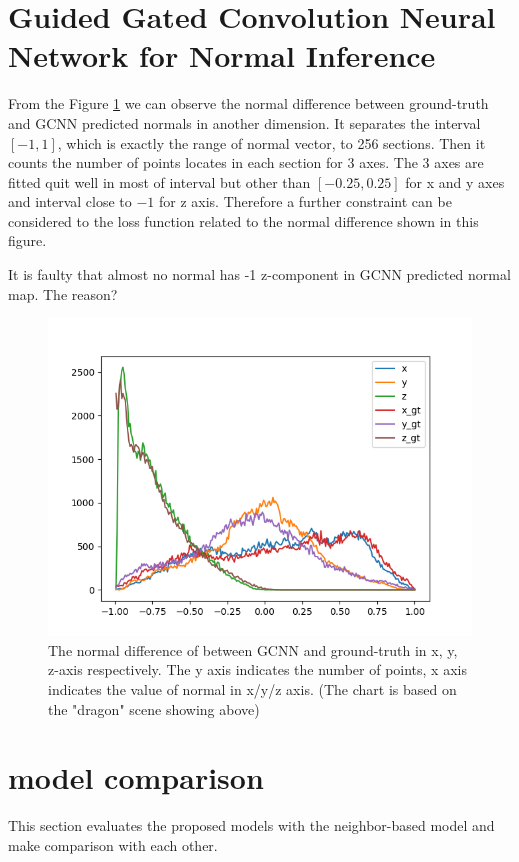 \section{Guided Gated Convolution Neural Network for Normal Inference }

From the Figure \ref{fig:normal-histo-diff} we can observe the normal difference between ground-truth and GCNN predicted normals in another dimension. It separates the interval $ \left[ -1,1 \right] $, which is exactly the range of normal vector, to 256 sections. Then it counts the number of points locates in each section for 3 axes.  The 3 axes are fitted quit well in most of interval but other than $ \left[ -0.25,0.25 \right] $ for x and y axes and  interval close to $ -1 $ for z axis. Therefore a further constraint can be considered to the loss function related to the normal difference shown in this figure.

It is faulty that almost no normal has -1 z-component in GCNN predicted normal map. The reason?
\begin{figure}[h!]
	\centering
	\includegraphics[width=\linewidth]{./Figures/normal-histo-diff.png}
	\caption{The normal difference of between GCNN and ground-truth in x, y, z-axis respectively. The y axis indicates the number of points, x axis indicates the value of normal in x/y/z axis. (The chart is based on the "dragon" scene showing above)}
	\label{fig:normal-histo-diff}
\end{figure}


\newpage 
\section{model comparison}
This section evaluates the proposed models with the neighbor-based model and make comparison with each other.

